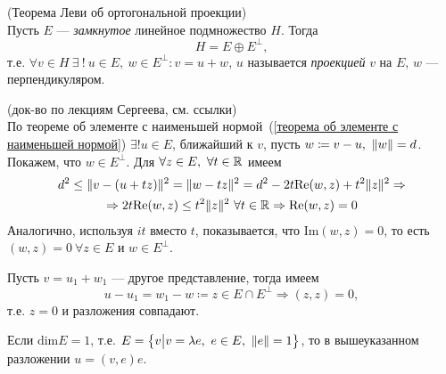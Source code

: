 \begin{theorem}
(Теорема Леви об ортогональной проекции)
~\\
Пусть $E$ --- \emph{замкнутое} линейное подмножество $H$. Тогда
$$H = E \oplus E^\perp,$$
т.е. $\forall v\in H~\exists~!~u\in E,~w\in E^\perp\colon v = u + w$, $u$ называется \emph{проекцией} $v$ на $E$, $w$ --- перпендикуляром.
\end{theorem}
\begin{proofocre}
(док-во по лекциям Сергеева, см. ссылки)~\\
\boxed{\exists}
По теореме об элементе с наименьшей нормой~(\ref{теорема об элементе с наименьшей нормой}) $\exists!u\in E$, ближайший к $v$, пусть $w \coloneqq v - u,~\|w\|=d$. Покажем, что $w\in E^\perp$. Для $\forall z\in E,~\forall t\in{\mathbb{R}}$ имеем
\begin{multline*}
    d^2 \le \|v - (u + tz)\|^2 = \|w - tz\|^2 = d^2 - 2t\text{Re}(w, z) + t^2\|z\|^2 \Rightarrow\\
    \Rightarrow 2t\text{Re}(w, z) \le t^2\|z\|^2~\forall t\in{\mathbb{R}} \Rightarrow \text{Re}(w, z) = 0
\end{multline*}
Аналогично, используя $it$ вместо $t$, показывается, что $\text{Im}(w, z) = 0$, то есть\\ $(w, z) = 0~\forall z\in E$ и $w\in E^\perp$.

\boxed{!} Пусть $v = u_1 + w_1$ --- другое представление, тогда имеем
$$u - u_1 = w_1 - w \coloneqq z \in E\cap E^\perp \Rightarrow (z, z) = 0,$$
т.е. $z = 0$ и разложения совпадают.
\end{proofocre}

\begin{corollary}
Если $\text{dim}E = 1$, т.е. $E = \big\{ v \big| v = \lambda e,~e\in E,~\|e\| = 1  \big\}$, то в вышеуказанном разложении $u = (v,e)e$.
\end{corollary}



